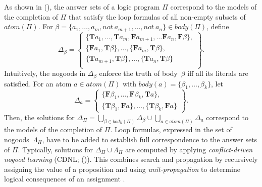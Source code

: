 \documentclass[letterpaper]{article}
\newcommand{\tass}[1]{\mathbf{T}#1}
\newcommand{\fass}[1]{\mathbf{F}#1}
\newcommand{\atom}[1]{atom(#1)}
\newcommand{\body}[1]{body(#1)}
\newcommand{\dneg}{not\ }
\newcommand{\citeap}[1]{\citeauthor{#1} (\citeyear{#1})}
\begin{document}
As shown in \citeap{lee05a}, the answer sets of a logic program $\Pi$ correspond to the models of the completion of $\Pi$ that satisfy the loop formulas of all non-empty subsets of $\atom{\Pi}$. For $\beta = \{ a_1 , \dots , a_m, \dneg a_{m+1} , \dots , \dneg a_n \} \in \body{\Pi}$, define
\[
\Delta_\beta = \left\{ \begin{array}{l}
\{\tass{a_1}, \dots, \tass{a_m}, \fass{a_{m+1}}, \dots \fass{a_n}, \fass{\beta} \}, \\
\{\fass{a_1}, \tass{\beta}\}, \dots, \{\fass{a_m}, \tass{\beta}\}, \\
\{\tass{a_{m+1}}, \tass{\beta}\}, \dots, \{\tass{a_n}, \tass{\beta}\} \\
\end{array} \right\}.
\]
Intuitively, the nogoods in $\Delta_\beta$ enforce the truth of body~$\beta$ iff all its literals are satisfied.
For an atom $a \in \atom{\Pi}$ with $\body{a} = \{\beta_1, \dots, \beta_k\}$, let
\[
\Delta_a = \left\{ \begin{array}{l}
\{\fass{\beta_1}, \dots, \fass{\beta_k}, \tass{a} \}, \\
\{\tass{\beta_1}, \fass{a}\}, \dots, \{\tass{\beta_k}, \fass{a}\}
\end{array} \right\}.
\]
Then, the solutions for $\Delta_\Pi = \bigcup_{\beta \in \body{\Pi}} \Delta_\beta \cup \bigcup_{a \in \atom{\Pi}} \Delta_a$ correspond to the models of the completion of $\Pi$. Loop formulas, expressed in the set of nogoods~$\Lambda_\Pi$, have to be added to establish full correspondence to the answer sets of $\Pi$.
Typically, solutions for $\Delta_\Pi \cup \Lambda_\Pi$ are computed by applying \emph{conflict-driven nogood learning} (CDNL; \citeap{gekanesc07a}). This combines search and propagation by recursively assigning the value of a proposition and using \emph{unit-propagation} to determine logical consequences of an assignment \cite{mitchell05a}.
\end{document}
